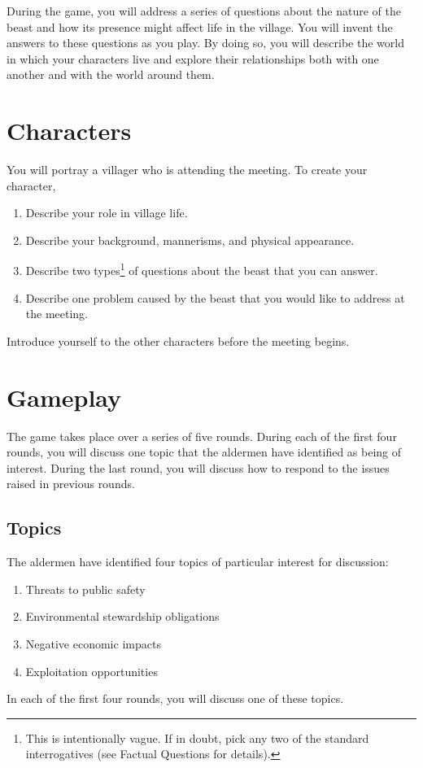 \documentclass[a6paper, 11pt, parskip=half, DIV=15]{scrartcl}
\begin{document}
During the game, you will address a series of questions about the nature of the beast and how its presence might affect life in the village. You will invent the answers to these questions as you play. By doing so, you will describe the world in which your characters live and explore their relationships both with one another and with the world around them.

\newpage
\enlargethispage{1.75\baselineskip}

\section*{Characters}
You will portray a villager who is attending the meeting. To create your character,
\begin{enumerate}[nosep]
	\item Describe your role in village life.
	\item Describe your background, mannerisms, and physical appearance.
	\item Describe two types\footnote[1]{This is intentionally vague. If in doubt, pick any two of the standard interrogatives (see {\setmainfont{QTBlackForest}Factual Questions} for details).} of questions about the beast that you can answer.
	\item Describe one problem caused by the beast that you would like to address at the meeting.
\end{enumerate}
Introduce yourself to the other characters before the meeting begins.

\section*{Gameplay}
The game takes place over a series of five rounds. 
During each of the first four rounds, you will discuss one topic that the aldermen have identified as being of interest.
During the last round, you will discuss how to respond to the issues raised in previous rounds. 

\newpage
\enlargethispage{1.75\baselineskip}

\subsection*{Topics}
The aldermen have identified four topics of particular interest for discussion:
\begin{enumerate}[nosep]
	\item Threats to public safety
	\item Environmental stewardship obligations
	\item Negative economic impacts
	\item Exploitation opportunities
\end{enumerate}
In each of the first four rounds, you will discuss one of these topics.
\end{document}
